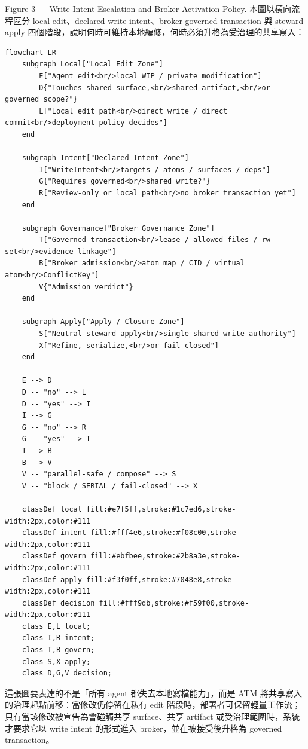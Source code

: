 \documentclass[a4paper,fontset=none]{ctexart}
\begin{document}
Figure 3 --- Write Intent Escalation and Broker Activation Policy. 本圖以橫向流程區分 local edit、declared write intent、broker-governed transaction 與 steward apply 四個階段，說明何時可維持本地編修，何時必須升格為受治理的共享寫入：

\begin{Verbatim}[breaklines=true,fontsize=\footnotesize]
flowchart LR
    subgraph Local["Local Edit Zone"]
        E["Agent edit<br/>local WIP / private modification"]
        D{"Touches shared surface,<br/>shared artifact,<br/>or governed scope?"}
        L["Local edit path<br/>direct write / direct commit<br/>deployment policy decides"]
    end

    subgraph Intent["Declared Intent Zone"]
        I["WriteIntent<br/>targets / atoms / surfaces / deps"]
        G{"Requires governed<br/>shared write?"}
        R["Review-only or local path<br/>no broker transaction yet"]
    end

    subgraph Governance["Broker Governance Zone"]
        T["Governed transaction<br/>lease / allowed files / rw set<br/>evidence linkage"]
        B["Broker admission<br/>atom map / CID / virtual atom<br/>ConflictKey"]
        V{"Admission verdict"}
    end

    subgraph Apply["Apply / Closure Zone"]
        S["Neutral steward apply<br/>single shared-write authority"]
        X["Refine, serialize,<br/>or fail closed"]
    end

    E --> D
    D -- "no" --> L
    D -- "yes" --> I
    I --> G
    G -- "no" --> R
    G -- "yes" --> T
    T --> B
    B --> V
    V -- "parallel-safe / compose" --> S
    V -- "block / SERIAL / fail-closed" --> X

    classDef local fill:#e7f5ff,stroke:#1c7ed6,stroke-width:2px,color:#111
    classDef intent fill:#fff4e6,stroke:#f08c00,stroke-width:2px,color:#111
    classDef govern fill:#ebfbee,stroke:#2b8a3e,stroke-width:2px,color:#111
    classDef apply fill:#f3f0ff,stroke:#7048e8,stroke-width:2px,color:#111
    classDef decision fill:#fff9db,stroke:#f59f00,stroke-width:2px,color:#111
    class E,L local;
    class I,R intent;
    class T,B govern;
    class S,X apply;
    class D,G,V decision;
\end{Verbatim}

這張圖要表達的不是「所有 agent 都失去本地寫檔能力」，而是 ATM 將共享寫入的治理起點前移：當修改仍停留在私有 edit 階段時，部署者可保留輕量工作流；只有當該修改被宣告為會碰觸共享 surface、共享 artifact 或受治理範圍時，系統才要求它以 write intent 的形式進入 broker，並在被接受後升格為 governed transaction。
\end{document}
